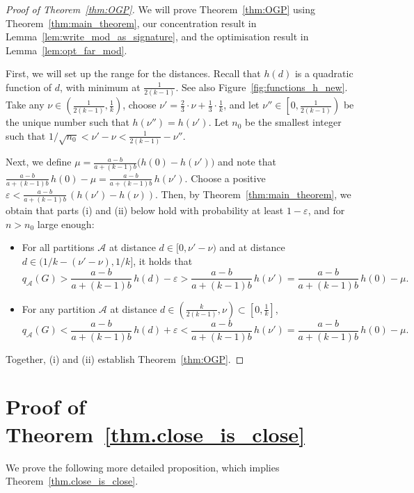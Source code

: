 \documentclass[a4paper,UKenglish,cleveref, autoref, thm-restate,numberwithinsect]{lipics-v2021}
\newcommand{\cA}{\mathcal{A}}
\begin{document}
\begin{proof}[Proof of Theorem~\ref{thm:OGP}]\label{proof.OGP} We will prove Theorem~\ref{thm:OGP} using Theorem~\ref{thm:main_theorem}, our concentration result in  Lemma~\ref{lem:write_mod_as_signature}, and the optimisation result in Lemma~\ref{lem:opt_far_mod}.

First, we will set up the range for the distances. Recall that $h(d)$ is a quadratic function of $d$, with minimum at $\frac{1}{2(k-1)}$. See also Figure~\ref{fig:functions_h_new}. Take any $\nu\in \left(\frac{1}{2(k-1)}, \frac{1}{k}\right)$, choose 
$\nu'= \frac{2}{3}\cdot \nu + \frac{1}{3}\cdot \frac{1}{k}$, and let $\nu''\in \left[0,\frac{1}{2(k-1)}\right)$ be the unique number such that $h(\nu'')= h(\nu')$. Let $n_0$ be the smallest integer such that $1/\sqrt{n_0}< \nu'-\nu< \frac{1}{2(k-1)}-\nu''$. 

Next, we define $\mu=\frac {a-b}{a+(k-1)b}\big(h(0)-h(\nu')\big)$ and 
note that $\frac {a-b}{a+(k-1)b}\,h(0)-\mu =  \frac {a-b}{a+(k-1)b}\,h(\nu')$. Choose a positive $\varepsilon<\frac{a-b}{a+(k-1)b}\,(h(\nu')- h(\nu))$. Then, by Theorem~\ref{thm:main_theorem}, we obtain that parts (i) and (ii) below hold with probability at least $1-\varepsilon$, and for $n>n_0$ large enough:
\begin{itemize}
    \item[(i)] For all partitions $\cA$ at distance $d\in [0,\nu'-\nu)$ and at distance $d\in (1/k-(\nu'-\nu),1/k]$, it holds that 
    \[q_{\cA}(G)>\frac {a-b}{a+(k-1)b}\,h(d)-\varepsilon > \frac {a-b}{a+(k-1)b}\,h(\nu')=\frac {a-b}{a+(k-1)b}\,h(0)-\mu.\]    
    \item[(ii)] For any partition $\cA$ at distance $d\in \left(\frac{k}{2(k-1)},\nu\right)\subset\left[0,\frac{1}{k}\right]$, 
    \[q_{\cA}(G)< \frac {a-b}{a+(k-1)b}\,h(d)+\varepsilon< \frac {a-b}{a+(k-1)b}\,h(\nu')=\frac {a-b}{a+(k-1)b}\,h(0)-\mu.\]    
 
\end{itemize}
Together, (i) and (ii) establish Theorem~\ref{thm:OGP}.
\end{proof}

\section{Proof of Theorem~\ref{thm.close_is_close}}\label{app:close_is_close}

We prove the following more detailed proposition, which implies Theorem~\ref{thm.close_is_close}.
\end{document}
